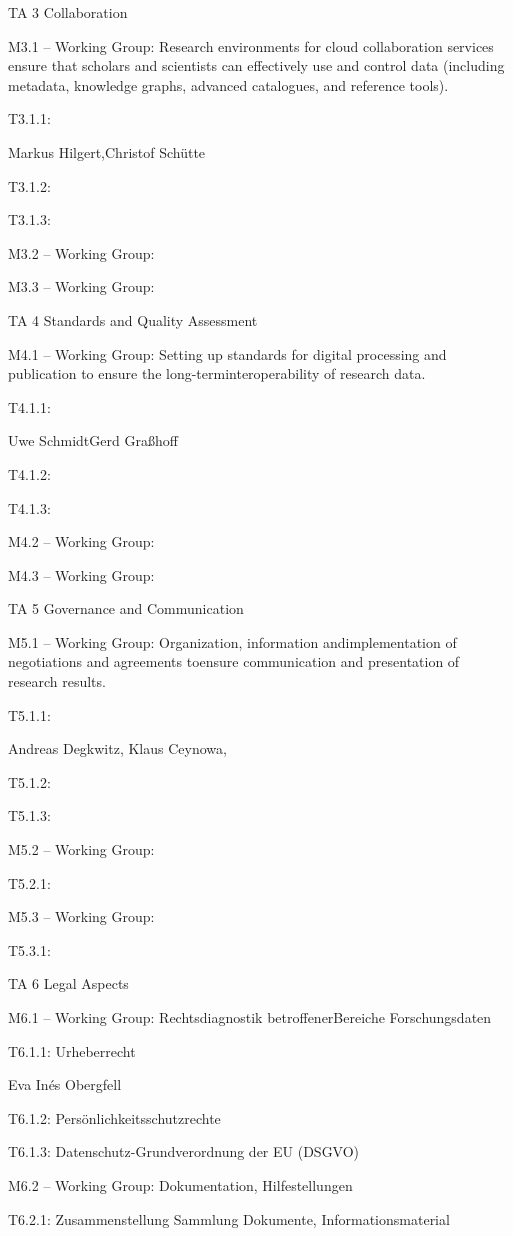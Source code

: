 \documentclass[
  english,
  paper=a4,
  oneside,captions=tableheading
]{scrbook}
\begin{document}
TA 3 Collaboration

M3.1 -- Working Group: Research environments for cloud collaboration
services ensure that scholars and scientists can effectively use and
control data (including metadata, knowledge graphs, advanced catalogues,
and reference tools).

T3.1.1:

Markus Hilgert,Christof Schütte

T3.1.2:

T3.1.3:

M3.2 -- Working Group:

M3.3 -- Working Group:

TA 4 Standards and Quality Assessment

M4.1 -- Working Group: Setting up standards for digital processing and
publication to ensure the long-terminteroperability of research data.

T4.1.1:

Uwe SchmidtGerd Graßhoff

T4.1.2:

T4.1.3:

M4.2 -- Working Group:

M4.3 -- Working Group:

TA 5 Governance and Communication

M5.1 -- Working Group: Organization, information andimplementation of
negotiations and agreements toensure communication and presentation of
research results.

T5.1.1:

Andreas Degkwitz, Klaus Ceynowa,

T5.1.2:

T5.1.3:

M5.2 -- Working Group:

T5.2.1:

M5.3 -- Working Group:

T5.3.1:

TA 6 Legal Aspects

M6.1 -- Working Group: Rechtsdiagnostik betroffenerBereiche
Forschungsdaten

T6.1.1: Urheberrecht

Eva Inés Obergfell

T6.1.2: Persönlichkeitsschutzrechte

T6.1.3: Datenschutz-Grundverordnung der EU (DSGVO)

M6.2 -- Working Group: Dokumentation, Hilfestellungen

T6.2.1: Zusammenstellung Sammlung Dokumente, Informationsmaterial
\end{document}
